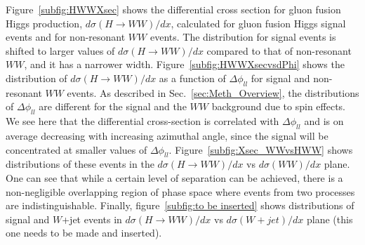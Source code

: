 \documentclass{cmspaper}
\begin{document}
Figure~\ref{subfig:HWWXsec} shows the differential cross section for gluon fusion Higgs production,
$d\sigma(H \rightarrow WW)/dx$, calculated for gluon fusion Higgs signal events and for non-resonant $WW$ events.
The distribution for signal events is shifted to larger values of  $d\sigma(H \rightarrow WW)/dx$ compared to that
of non-resonant $WW$, and it has a narrower width. 
Figure~\ref{subfig:HWWXsecvsdPhi} shows the distribution of $d\sigma(H \rightarrow WW)/dx$ as a function of
$\Delta\phi_{ll}$ for signal and non-resonant $WW$ events.
As described in Sec.~\ref{sec:Meth_Overview}, the distributions of $\Delta\phi_{ll}$ are different for the signal and the $WW$
background due to spin effects.  
We see here that the differential cross-section is correlated with $\Delta\phi_{ll}$ and is on average decreasing with
increasing azimuthal angle, since the signal will be concentrated at smaller values of $\Delta\phi_{ll}$.
Figure~\ref{subfig:Xsec_WWvsHWW} shows distributions of these events in the $d\sigma(H \rightarrow WW)/dx$ 
vs $d\sigma(WW)/dx$ plane. One can see that while a certain level of separation can be achieved, there is a 
non-negligible overlapping region of phase space where events from two processes are indistinguishable.
Finally, figure~\ref{subfig:to be inserted} shows distributions of signal and $W$+jet 
events in $d\sigma(H \rightarrow WW)/dx$ vs $d\sigma(W+jet)/dx$ plane (this one needs to be made and inserted).
\end{document}
